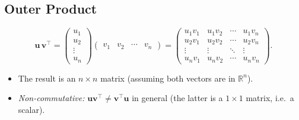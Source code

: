\subsection{Outer Product}
\[
\mathbf{u} \, \mathbf{v}^\top =
\begin{pmatrix}
u_1 \\
u_2 \\
\vdots \\
u_n
\end{pmatrix}
\begin{pmatrix}
v_1 & v_2 & \cdots & v_n
\end{pmatrix}
=
\begin{pmatrix}
u_1 v_1 & u_1 v_2 & \cdots & u_1 v_n \\
u_2 v_1 & u_2 v_2 & \cdots & u_2 v_n \\
\vdots & \vdots & \ddots & \vdots \\
u_n v_1 & u_n v_2 & \cdots & u_n v_n
\end{pmatrix}.
\]
\begin{itemize}
\item The result is an $n \times n$ matrix (assuming both vectors are in $\mathbb{R}^n$).
\item \emph{Non-commutative:} $\mathbf{u} \mathbf{v}^\top \neq \mathbf{v}^\top \mathbf{u}$ in general 
      (the latter is a $1 \times 1$ matrix, i.e.\ a scalar).
\end{itemize}